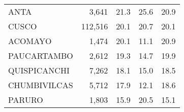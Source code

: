 \begin{tabular}{lrrrr}
	\cellcolor[HTML]{FD6864}ANTA                                       & 3,641                                                                 & 21.3                                                                             & 25.6                                                                        & 20.9                                                                                \\
	\cellcolor[HTML]{FD6864}CUSCO                                      & 112,516                                                               & 20.1                                                                             & 20.7                                                                        & 20.1                                                                                \\
	\cellcolor[HTML]{FD6864}ACOMAYO                                    & 1,474                                                                 & 20.1                                                                             & 11.1                                                                        & 20.9                                                                                \\
	\cellcolor[HTML]{FD6864}PAUCARTAMBO                                & 2,612                                                                 & 19.3                                                                             & 14.7                                                                        & 19.9                                                                                \\
	\cellcolor[HTML]{FD6864}QUISPICANCHI                               & 7,262                                                                 & 18.1                                                                             & 15.0                                                                        & 18.5                                                                                \\
	\cellcolor[HTML]{FD6864}CHUMBIVILCAS                               & 5,712                                                                 & 17.9                                                                             & 12.1                                                                        & 18.6                                                                                \\
	\cellcolor[HTML]{FD6864}PARURO                                     & 1,803                                                                 & 15.9                                                                             & 20.5                                                                        & 15.1                                                                                \\

\end{tabular}
